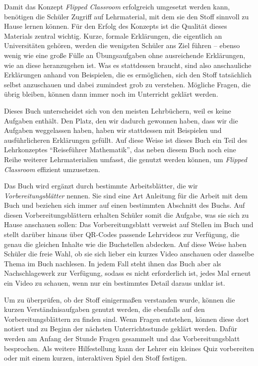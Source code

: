 \documentclass[../main.tex]{subfiles}
\begin{document}
Damit das Konzept \emph{Flipped Classroom} erfolgreich umgesetzt werden kann, benötigen die Schüler Zugriff auf Lehrmaterial, mit dem sie den Stoff sinnvoll zu Hause lernen können. Für den Erfolg des Konzepts ist die Qualität dieses Materials zentral wichtig. Kurze, formale Erklärungen, die eigentlich an Universitäten gehören, werden die wenigsten Schüler ans Ziel führen -- ebenso wenig wie eine große Fülle an Übungsaufgaben ohne ausreichende Erklärungen, wie an diese heranzugehen ist. Was es stattdessen braucht, sind also anschauliche Erklärungen anhand von Beispielen, die es ermöglichen, sich den Stoff tatsächlich selbst anzuschauen und dabei zumindest grob zu verstehen. Mögliche Fragen, die übrig bleiben, können dann immer noch im Unterricht geklärt werden.

Dieses Buch unterscheidet sich von den meisten Lehrbüchern, weil es keine Aufgaben enthält. Den Platz, den wir dadurch gewonnen haben, dass wir die Aufgaben weggelassen haben, haben wir stattdessen mit Beispielen und ausführlicheren Erklärungen gefüllt. Auf diese Weise ist dieses Buch ein Teil des Lehrkonzeptes \enquote{Reiseführer Mathematik}, das neben diesem Buch noch eine Reihe weiterer Lehrmaterialien umfasst, die genutzt werden können, um \emph{Flipped Classroom} effizient umzusetzen.

Das Buch wird ergänzt durch bestimmte Arbeitsblätter, die wir \emph{Vorbereitungsblätter} nennen. Sie sind eine Art Anleitung für die Arbeit mit dem Buch und beziehen sich immer auf einen bestimmten Abschnitt des Buchs. Auf diesen Vorbereitungsblättern erhalten Schüler somit die Aufgabe, was sie sich zu Hause anschauen sollen: Das Vorbereitungsblatt verweist auf Stellen im Buch und stellt darüber hinaus über QR-Codes passende Lehrvideos zur Verfügung, die genau die gleichen Inhalte wie die Buchstellen abdecken. Auf diese Weise haben Schüler die freie Wahl, ob sie sich lieber ein kurzes Video anschauen oder dasselbe Thema im Buch nachlesen. In jedem Fall steht ihnen das Buch aber als Nachschlagewerk zur Verfügung, sodass es nicht erforderlich ist, jedes Mal erneut ein Video zu schauen, wenn nur ein bestimmtes Detail daraus unklar ist.

Um zu überprüfen, ob der Stoff einigermaßen verstanden wurde, können die kurzen Verständnisaufgaben genutzt werden, die ebenfalls auf den Vorbereitungsblättern zu finden sind. Wenn Fragen entstehen, können diese dort notiert und zu Beginn der nächsten Unterrichtsstunde geklärt werden. Dafür werden am Anfang der Stunde Fragen gesammelt und das Vorbereitungsblatt besprochen. Als weitere Hilfestellung kann der Lehrer ein kleines Quiz vorbereiten oder mit einem kurzen, interaktiven Spiel den Stoff festigen.
\end{document}
